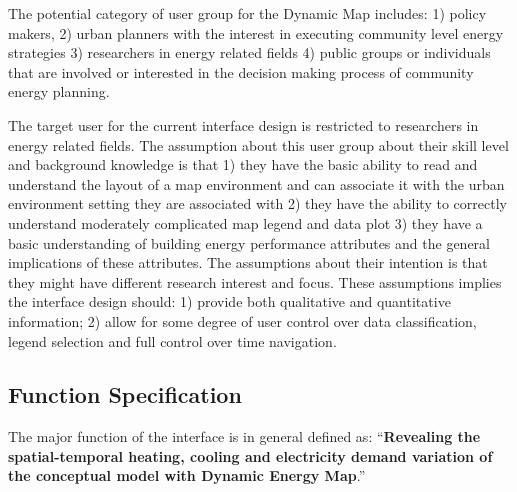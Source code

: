 The potential category of user group for the Dynamic Map includes: 1)
policy makers, 2) urban planners with the interest in executing
community level energy strategies 3) researchers in energy related
fields 4) public groups or individuals that are involved or interested
in the decision making process of community energy planning.

The target user for the current interface design is restricted to
researchers in energy related fields. The assumption about this user
group about their skill level and background knowledge is that 1) they
have the basic ability to read and understand the layout of a map
environment and can associate it with the urban environment setting
they are associated with 2) they have the ability to correctly
understand moderately complicated map legend and data plot 3) they
have a basic understanding of building energy performance attributes
and the general implications of these attributes. The assumptions
about their intention is that they might have different research
interest and focus. These assumptions implies the interface design
should: 1) provide both qualitative and quantitative information; 2)
allow for some degree of user control over data classification, legend
selection and full control over time navigation. 

\subsection{Function Specification}
The major function of the interface is in general defined as:
``\textbf{Revealing the spatial-temporal heating, cooling and
  electricity demand variation of the conceptual model with Dynamic
  Energy Map}.''

